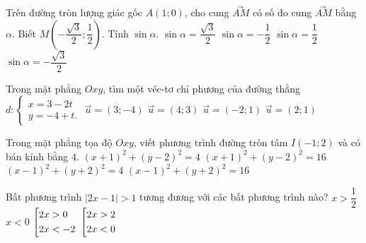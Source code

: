 \begin{ex}%
Trên đường tròn lượng giác gốc $A (1; 0)$, cho cung $\overset{\curvearrowright}{AM}$ có số đo cung $\overset{\curvearrowright}{AM}$ bằng $\alpha$. Biết $M \left(-\dfrac{\sqrt{3}}{2}; \dfrac{1}{2}\right)$. Tính $\sin \alpha$. 
	\choice
	{$\sin \alpha = \dfrac{\sqrt{3}}{2}$}
	{$\sin \alpha =- \dfrac{1}{2}$}
	{\True $\sin \alpha = \dfrac{1}{2}$}
	{$\sin \alpha = - \dfrac{\sqrt{3}}{2}$}
\end{ex}

\begin{ex}%
Trong mặt phẳng $O x y$, tìm một véc-tơ chỉ phương của đường thẳng $d: \begin{cases}
x = 3 - 2t \\ 
y = -4 + t.
\end{cases}$
	\choice
	{$\overrightarrow{u} = (3; -4)$}
	{$\overrightarrow{u} = (4; 3)$}
	{\True $\overrightarrow{u} = (-2; 1)$}
	{$\overrightarrow{u} = (2; 1)$}
\end{ex}

\begin{ex}%
Trong mặt phẳng tọa độ $Oxy$, viết phương trình đường tròn tâm $I(-1;2)$ và có bán kính bằng $4$.
\choice
{$(x+1)^2+(y-2)^2=4$}
{\True $(x+1)^2+(y-2)^2=16$}
{$(x-1)^2+(y+2)^2=4$}
{$(x-1)^2+(y+2)^2=16$}
\end{ex}

\begin{ex}%
Bất phương trình $|2x-1|>1$ tương đương với các bất phương trình nào?
\choice
{$x>\dfrac{1}{2}$}
{$x<0$}
{$\left[\begin{aligned}&2x>0\\&2x<-2\end{aligned}\right.$}
{\True $\left[\begin{aligned}&2x>2\\&2x<0\end{aligned}\right.$}
\end{ex}

